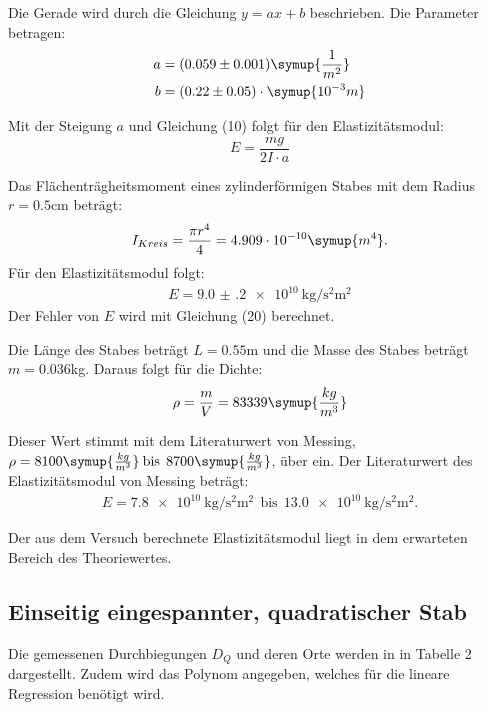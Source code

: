 Die Gerade wird durch die Gleichung $y = ax + b$ beschrieben. Die Parameter betragen:
\begin{align*}
  a &= (0.059 \pm 0.001) \symup{\frac{1}{m^2}}\\
  b &= (0.22  \pm 0.05) \cdot \symup{10^{-3}m}
\end{align*}

Mit der Steigung $a$ und Gleichung (10) folgt für den Elastizitätsmodul:
\begin{equation}
  E = \frac{mg}{2I \cdot a}
\end{equation}

Das Flächenträgheitsmoment eines zylinderförmigen Stabes mit dem Radius
$r = 0.5$cm beträgt:
\begin{equation}
  I_{Kreis} = \frac{\pi r^4}{4} = 4.909 \cdot 10^{-10} \symup{m^4} .
\end{equation}
Für den Elastizitätsmodul folgt:
\begin{align*}
  E = \SI{9.0(2)e10}{\kilo\gram\per\second\squared\square\meter}
\end{align*}
Der Fehler von $E$ wird mit Gleichung (20) berechnet.

Die Länge des Stabes beträgt $L = 0.55$m und die Masse des Stabes beträgt $m = 0.036$kg.
Daraus folgt für die Dichte:
\begin{equation}
  \rho = \frac{m}{V} = 83339 \symup{\frac{kg}{m^3}}
\end{equation}

Dieser Wert stimmt mit dem Literaturwert von Messing, $\rho =8100\symup{\frac{kg}{m^3}}\: \text{bis}\:\: 8700\symup{\frac{kg}{m^3}}$,
über ein.
Der Literaturwert des Elastizitätsmodul von Messing beträgt:
\begin{align*}
  E = \SI{7.8e10}{\kilo\gram\per\second\squared\square\meter} \:\: \text{bis} \:\:
  \SI{13.0e10}{\kilo\gram\per\second\squared\square\meter} .
\end{align*}

Der aus dem Versuch berechnete Elastizitätsmodul liegt in dem erwarteten Bereich des Theoriewertes.

\subsection{Einseitig eingespannter, quadratischer Stab}
Die gemessenen Durchbiegungen $D_Q$ und deren Orte werden in in Tabelle 2 dargestellt. Zudem wird
das Polynom angegeben, welches für die lineare Regression benötigt wird.

